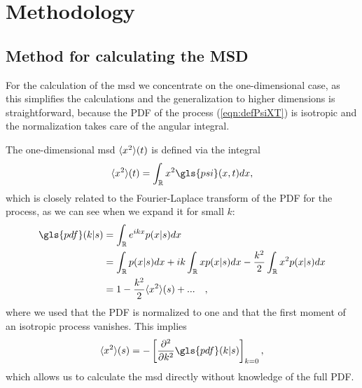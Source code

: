 \chapter{Methodology}

\section{Method for calculating the MSD} 

For the calculation of the \gls{msd} we concentrate on the one-dimensional case, as this simplifies the calculations and the generalization to higher dimensions is straightforward, because the \gls{PDF} of the process (\ref{eqn:defPsiXT}) is isotropic and the normalization takes care of the angular integral. 

The one-dimensional \gls{msd} $\langle x^2 \rangle(t)$ is defined via the integral 
%
\begin{align}
\mean{x^2}(t) = \int_{\mathbb{R}} x^2 \gls{psi}(x,t) dx ,
\end{align}
%
which is closely related to the Fourier-Laplace transform of the \gls{PDF} for the process, as we can see when we expand it for small $k$:
%
\begin{align}
\gls{pdf}(k|s) &= \int_{\mathbb{R}}  e^{ik x} p(x|s) dx  \\
&= \int_{\mathbb{R}}   p(x|s) dx +  i k \int_{\mathbb{R}}   x p(x|s) dx - \frac{k^2}{2} \int_{\mathbb{R}}   x^2 p(x|s) dx \\
&= 1 - \frac{k^2}{2} \mean{x^2}(s)  + ... \quad ,
\end{align}
%
where we used that the \gls{PDF} is normalized to one and that the first moment of an isotropic process vanishes. This implies 
%
\begin{align}
\mean{x^2}(s) = - \left[ \npder{}{k}{2} \gls{pdf}(k|s) \right]_{k=0} \label{eqn:MSDDerivative}, 
\end{align}
%
which allows us to calculate the \gls{msd} directly without knowledge of the full \gls{PDF}.

